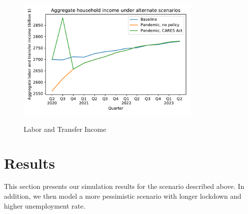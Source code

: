 \begin{figure}
	\centering
	\caption{Labor and Transfer Income}
	\label{labor_income}
	{ \includegraphics[width=0.8\textwidth]{./Figures/AggLT}}
\end{figure}


\section{Results}

This section presents our simulation results for the scenario described above. In addition, we then model a more pessimistic scenario with longer lockdown and higher unemployment rate.

